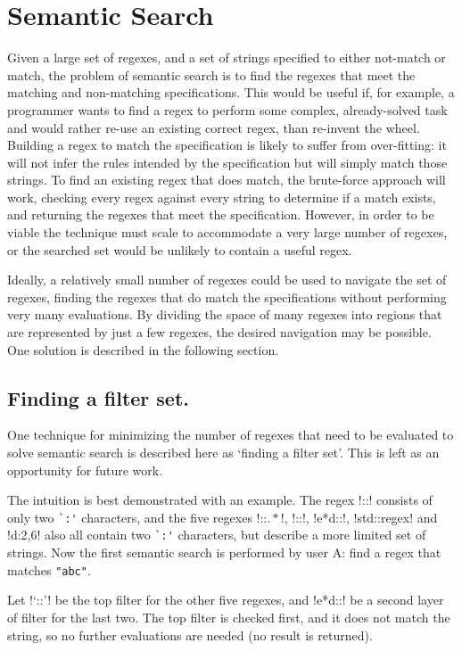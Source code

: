 \section{Semantic Search}
Given a large set of regexes, and a set of strings specified to either not-match or match, the problem of semantic search is to find the regexes that meet the matching and non-matching specifications.  This would be useful if, for example, a programmer wants to find a regex to perform some complex, already-solved task and would rather re-use an existing correct regex, than re-invent the wheel.  Building a regex to match the specification is likely to suffer from over-fitting: it will not infer the rules intended by the specification but will simply match those strings.  To find an existing regex that does match, the brute-force approach will work, checking every regex against every string to determine if a match exists, and returning the regexes that meet the specification.  However, in order to be viable the technique must scale to accommodate a very large number of regexes, or the searched set would be unlikely to contain a useful regex.

Ideally, a relatively small number of regexes could be used to navigate the set of regexes, finding the regexes that do match the specifications without performing very many evaluations.  By dividing the space of many regexes into regions that are represented by just a few regexes, the desired navigation may be possible.  One solution is described in the following section.

\subsection{Finding a filter set.} One technique for minimizing the number of regexes that need to be evaluated to solve semantic search is described here as `finding a filter set'.  This is left as an opportunity for future work.

The intuition is best demonstrated with an example.  The regex \cverb!::! consists of only two \verb!`:'! characters, and the five regexes \cverb!::\(.*\)!, \cverb!\s*::\s*!, \cverb!e*d::!, \cverb!std::regex! and \cverb!d:{2,6}! also all contain two \verb!`:'! characters, but describe a more limited set of strings.  Now the first semantic search is performed by user A: find a regex that matches \verb!"abc"!.

Let \cverb!`::'! be the top filter for the other five regexes, and \cverb!e*d::! be a second layer of filter for the last two.  The top filter is checked first, and it does not match the string, so no further evaluations are needed (no result is returned).

